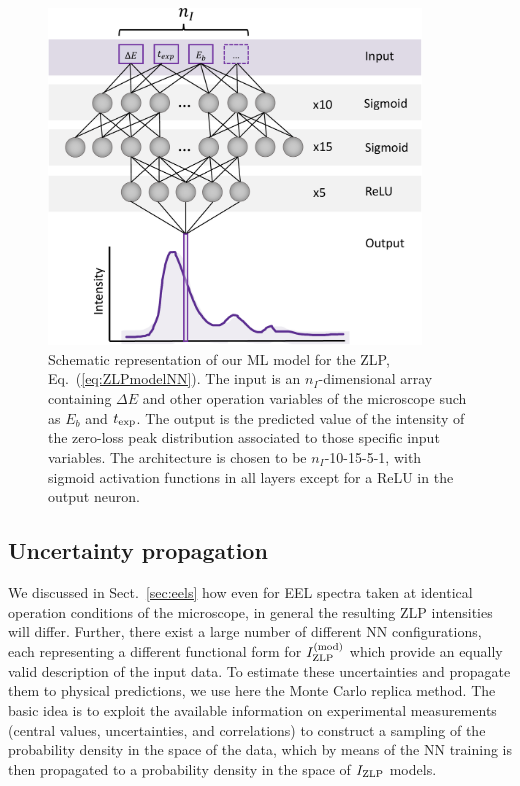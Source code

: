 \begin{figure}[t]
    \centering
    \includegraphics[width=99mm]{plots/architecture.pdf}
    \caption{Schematic representation of our ML model for the ZLP, Eq.~(\ref{eq:ZLPmodelNN}).
      The input is an $n_I$-dimensional array containing $\Delta E$ and other
      operation variables of the microscope such as $E_b$ and $t_{\rm exp}$.
      The output is the predicted value of the intensity of the zero-loss peak
      distribution associated to those specific input variables.
      The architecture is chosen to be $n_I$-10-15-5-1, with sigmoid activation functions
      in all layers except for a ReLU in the output neuron.
    }
    \label{fig:architecture}
\end{figure}

\subsection{Uncertainty propagation}

We discussed in Sect.~\ref{sec:eels} how
even for EEL spectra taken at identical operation conditions of the microscope,
in general the resulting ZLP intensities will differ.
%
Further, there exist a large number of different NN configurations, each
representing a different functional form for $I_{\rm ZLP}^{(\rm mod)}$ which provide
an equally valid description of the input data.
%
To  estimate these uncertainties and propagate them to physical predictions,
we use here the Monte Carlo replica method.
%
The basic idea  is to exploit the available information
on experimental measurements (central values, uncertainties, and correlations)
to construct a sampling of the probability density in the space of 
the data, which by means of the NN training is then propagated
to a probability density in the space of $I_{\rm ZLP}$ models.

